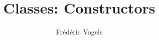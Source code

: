 \usepackage{ucll-code}
\usetikzlibrary{shadows,shapes.multipart}

\title{Classes: Constructors}
\author{Fr\'ed\'eric Vogels}

\newcommand{\highlightbox}[2][]{
  \draw[opacity=.75,ultra thick,red,#1] ($ (#2.south west) + (-.1,-.1) $) rectangle ($ (#2.north east) + (.1,.1) $)
}




\begin{frame}
  \titlepage
\end{frame}









